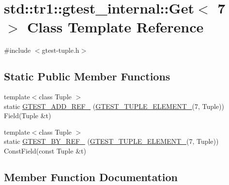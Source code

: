 \hypertarget{classstd_1_1tr1_1_1gtest__internal_1_1_get_3_017_01_4}{}\section{std\+::tr1\+::gtest\+\_\+internal\+::Get$<$ 7 $>$ Class Template Reference}
\label{classstd_1_1tr1_1_1gtest__internal_1_1_get_3_017_01_4}


{\ttfamily \#include $<$gtest-\/tuple.\+h$>$}

\subsection*{Static Public Member Functions}
\begin{DoxyCompactItemize}
\item 
{\footnotesize template$<$class Tuple $>$ }\\static \mbox{\hyperlink{classstd_1_1tr1_1_1gtest__internal_1_1_get_3_017_01_4_ae1245f00b2ad610a130681b5bc81051c}{G\+T\+E\+S\+T\+\_\+\+A\+D\+D\+\_\+\+R\+E\+F\+\_\+}} (\mbox{\hyperlink{gtest-tuple_8h_a1b7f133d8aa02e0b7afed7b66781eeb7}{G\+T\+E\+S\+T\+\_\+\+T\+U\+P\+L\+E\+\_\+\+E\+L\+E\+M\+E\+N\+T\+\_\+}}(7, Tuple)) Field(Tuple \&t)
\item 
{\footnotesize template$<$class Tuple $>$ }\\static \mbox{\hyperlink{classstd_1_1tr1_1_1gtest__internal_1_1_get_3_017_01_4_afb7bd56e0697304325cd157d11df4a7b}{G\+T\+E\+S\+T\+\_\+\+B\+Y\+\_\+\+R\+E\+F\+\_\+}} (\mbox{\hyperlink{gtest-tuple_8h_a1b7f133d8aa02e0b7afed7b66781eeb7}{G\+T\+E\+S\+T\+\_\+\+T\+U\+P\+L\+E\+\_\+\+E\+L\+E\+M\+E\+N\+T\+\_\+}}(7, Tuple)) Const\+Field(const Tuple \&t)
\end{DoxyCompactItemize}


\subsection{Member Function Documentation}
\mbox{\label{classstd_1_1tr1_1_1gtest__internal_1_1_get_3_017_01_4_ae1245f00b2ad610a130681b5bc81051c}} 
